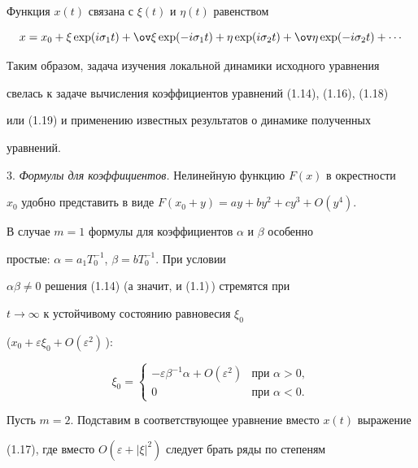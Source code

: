 Функция $x(t)$ связана с $\xi(t)$ и $\eta(t)$ равенством


\begin{equation}


x = x_0 + \xi\exp(i\sigma_1 t) + \ov\xi\exp(-i\sigma_1 t) +


\eta\exp(i\sigma_2 t) + \ov\eta\exp(-i\sigma_2 t) + \dotsb


\end{equation}


Таким образом, задача изучения локальной динамики исходного уравнения


свелась к задаче вычисления коэффициентов уравнений (1.14), (1.16), (1.18)


или (1.19) и применению известных результатов о динамике полученных


уравнений.


\medskip





3. {\it Формулы для коэффициентов.} Нелинейную функцию $F(x)$ в окрестности


$x_0$ удобно представить в виде $F(x_0+y) = ay+by^2+cy^3+O(y^4)$.





В случае $m=1$ формулы для коэффициентов $\alpha$ и $\beta$ особенно


простые: $\alpha=a_1T_0^{-1}$, $\beta=bT_0^{-1}$. При условии


$\alpha\beta\neq0$ решения (1.14) (а значит, и (1.1)\,) стремятся при


$t\to\infty$ к устойчивому состоянию равновесия $\xi_0$


($x_0+\varepsilon\xi_0+O(\varepsilon^2)$\,):


$$


\xi_0 =


\begin{cases}


-\varepsilon\beta^{-1}\alpha + O(\varepsilon^2) & \text{при } \alpha >0, \\


0 & \text{при } \alpha < 0.


\end{cases}


$$


Пусть $m=2$. Подставим в соответствующее уравнение вместо $x(t)$ выражение


(1.17), где вместо $O(\varepsilon+|\xi|^2)$ следует брать ряды по степеням


